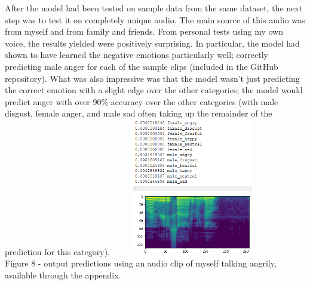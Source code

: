 \documentclass[12pt]{article}
\begin{document}
\noindent After the model had been tested on sample data from the same dataset, the next step was to test it on completely unique audio. The main source of this audio was from myself and from family and friends. From personal tests using my own voice, the results yielded were positively surprising. In particular, the model had shown to have learned the negative emotions particularly well; correctly predicting male anger for each of the sample clips (included in the GitHub repository). What was also impressive was that the model wasn't just predicting the correct emotion with a slight edge over the other categories; the model would predict anger with over 90\% accuracy over the other categories (with male disgust, female anger, and male sad often taking up the remainder of the prediction for this category).
\newpage
\includegraphics[width=7cm, height=6cm]{figure_8_personal_prediction}
\\
Figure 8 - output predictions using an audio clip of myself talking angrily, available through the appendix.
\\
\end{document}
